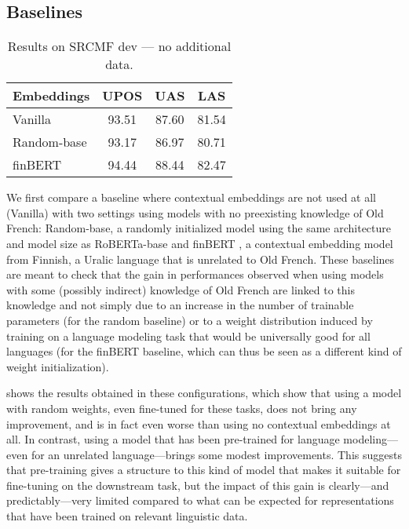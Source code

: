 \subsection{Baselines}\label{sec|baselines}
\begin{table}[thb]
    \centering
    \tablefontsize
    \begin{tabular}{l*{3}{S[table-format=2.2]}}
        \toprule
        {\textbf{Embeddings}} & {\textbf{UPOS}} & {\textbf{UAS}} & {\textbf{LAS}} \\
        \midrule
        Vanilla               & 93.51           & 87.60          & 81.54          \\
        Random-base           & 93.17           & 86.97          & 80.71          \\
        finBERT               & 94.44           & 88.44          & 82.47          \\
        \bottomrule
    \end{tabular}
    \caption{Results on SRCMF dev — no additional data.}\label{tab|nodata}
\end{table}

We first compare a baseline where contextual embeddings are not used at all (Vanilla) with two settings using models with no preexisting knowledge of Old French: Random-base, a randomly initialized model using the same architecture and model size as RoBERTa-base \citep{liu-etal-2019-roberta} and finBERT \citep{virtanen-etal-2019-multilingual}, a contextual embedding model from Finnish, a Uralic language that is unrelated to Old French. These baselines are meant to check that the gain in performances observed when using models with some (possibly indirect) knowledge of Old French are linked to this knowledge and not simply due to an increase in the number of trainable parameters (for the random baseline) or to a weight distribution induced by training on a language modeling task that would be universally good for all languages (for the finBERT baseline, which can thus be seen as a different kind of weight initialization).

 shows the results obtained in these configurations, which show that using a model with random weights, even fine-tuned for these tasks, does not bring any improvement, and is in fact even worse than using no contextual embeddings at all. In contrast, using a model that has been pre-trained for language modeling---even for an unrelated language---brings some modest improvements. This suggests that pre-training gives a structure to this kind of model that makes it suitable for fine-tuning on the downstream task, but the impact of this gain is clearly---and predictably---very limited compared to what can be expected for representations that have been trained on relevant linguistic data.


